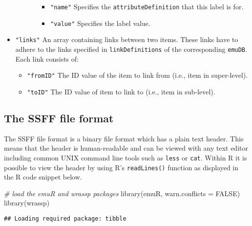 \documentclass[
]{book}
\newenvironment{Shaded}{\begin{snugshade}}{\end{snugshade}}
\newcommand{\AttributeTok}[1]{\textcolor[rgb]{0.77,0.63,0.00}{#1}}
\newcommand{\CommentTok}[1]{\textcolor[rgb]{0.56,0.35,0.01}{\textit{#1}}}
\newcommand{\ConstantTok}[1]{\textcolor[rgb]{0.00,0.00,0.00}{#1}}
\newcommand{\FunctionTok}[1]{\textcolor[rgb]{0.00,0.00,0.00}{#1}}
\newcommand{\NormalTok}[1]{#1}
\begin{document}
\begin{itemize}
\begin{itemize}
\begin{itemize}
      \begin{itemize}
      \item
        \texttt{"name"} Specifies the \texttt{attributeDefinition} that this
        label is for.
      \item
        \texttt{"value"} Specifies the label value.
      \end{itemize}
    \end{itemize}
  \end{itemize}
\item
  \texttt{"links"} An array containing links between two items. These links have to adhere to the links specified in \texttt{linkDefinitions} of the corresponding \texttt{emuDB}. Each link consists of:

  \begin{itemize}
  \item
    \texttt{"fromID"} The ID value of the item to link from (i.e., item in super-level).
  \item
    \texttt{"toID"} The ID value of item to link to (i.e., item in sub-level).
  \end{itemize}
\end{itemize}

\hypertarget{subsec:app-chapFileFormatsSSFF}{%
\subsection{The SSFF file format}\label{subsec:app-chapFileFormatsSSFF}}

The SSFF file format is a binary file format which has a plain text header. This means that the header is human-readable and can be viewed with any text editor including common UNIX command line tools such as \texttt{less} or \texttt{cat}. Within R it is possible to view the header by using R's \texttt{readLines()} function as displayed in the R code snippet below.

\begin{Shaded}
\begin{Highlighting}[]
\CommentTok{\# load the emuR and wrassp packages}
\FunctionTok{library}\NormalTok{(emuR, }\AttributeTok{warn.conflicts =} \ConstantTok{FALSE}\NormalTok{)}
\FunctionTok{library}\NormalTok{(wrassp)}
\end{Highlighting}
\end{Shaded}

\begin{verbatim}
## Loading required package: tibble
\end{verbatim}
\end{document}
